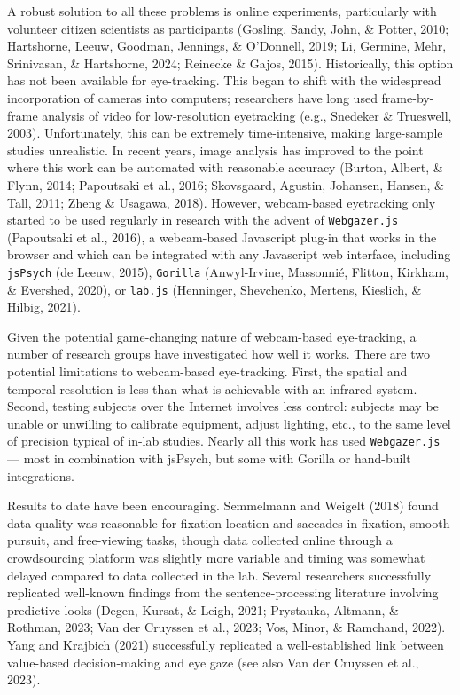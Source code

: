 \documentclass[
  man,floatsintext]{apa6}
\begin{document}
A robust solution to all these problems is online experiments, particularly with volunteer citizen scientists as participants (Gosling, Sandy, John, \& Potter, 2010; Hartshorne, Leeuw, Goodman, Jennings, \& O'Donnell, 2019; Li, Germine, Mehr, Srinivasan, \& Hartshorne, 2024; Reinecke \& Gajos, 2015). Historically, this option has not been available for eye-tracking. This began to shift with the widespread incorporation of cameras into computers; researchers have long used frame-by-frame analysis of video for low-resolution eyetracking (e.g., Snedeker \& Trueswell, 2003). Unfortunately, this can be extremely time-intensive, making large-sample studies unrealistic. In recent years, image analysis has improved to the point where this work can be automated with reasonable accuracy (Burton, Albert, \& Flynn, 2014; Papoutsaki et al., 2016; Skovsgaard, Agustin, Johansen, Hansen, \& Tall, 2011; Zheng \& Usagawa, 2018). However, webcam-based eyetracking only started to be used regularly in research with the advent of \texttt{Webgazer.js} (Papoutsaki et al., 2016), a webcam-based Javascript plug-in that works in the browser and which can be integrated with any Javascript web interface, including \texttt{jsPsych} (de Leeuw, 2015), \texttt{Gorilla} (Anwyl-Irvine, Massonnié, Flitton, Kirkham, \& Evershed, 2020), or \texttt{lab.js} (Henninger, Shevchenko, Mertens, Kieslich, \& Hilbig, 2021).

Given the potential game-changing nature of webcam-based eye-tracking, a number of research groups have investigated how well it works. There are two potential limitations to webcam-based eye-tracking. First, the spatial and temporal resolution is less than what is achievable with an infrared system. Second, testing subjects over the Internet involves less control: subjects may be unable or unwilling to calibrate equipment, adjust lighting, etc., to the same level of precision typical of in-lab studies. Nearly all this work has used \texttt{Webgazer.js} --- most in combination with jsPsych, but some with Gorilla or hand-built integrations.

Results to date have been encouraging. Semmelmann and Weigelt (2018) found data quality was reasonable for fixation location and saccades in fixation, smooth pursuit, and free-viewing tasks, though data collected online through a crowdsourcing platform was slightly more variable and timing was somewhat delayed compared to data collected in the lab. Several researchers successfully replicated well-known findings from the sentence-processing literature involving predictive looks (Degen, Kursat, \& Leigh, 2021; Prystauka, Altmann, \& Rothman, 2023; Van der Cruyssen et al., 2023; Vos, Minor, \& Ramchand, 2022). Yang and Krajbich (2021) successfully replicated a well-established link between value-based decision-making and eye gaze (see also Van der Cruyssen et al., 2023).
\end{document}
